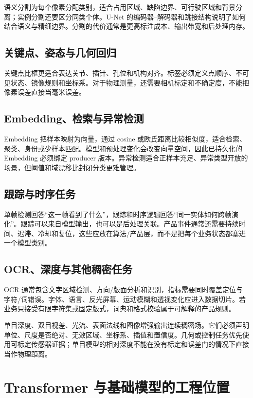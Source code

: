 语义分割为每个像素分配类别，适合占用区域、缺陷边界、可行驶区域和背景分离；实例分割还要区分同类个体。U-Net 的编码器--解码器和跳接结构说明了如何结合语义与精细边界\cite{unet}。分割的代价通常是更高标注成本、输出带宽和后处理内存。

\subsection{关键点、姿态与几何回归}

关键点比框更适合表达关节、插针、孔位和机构对齐。标签必须定义点顺序、不可见状态、镜像规则和坐标系。对于物理测量，还需要相机标定和不确定度，不能把像素误差直接当毫米误差。

\subsection{Embedding、检索与异常检测}

Embedding 把样本映射为向量，通过 cosine 或欧氏距离比较相似度，适合检索、聚类、身份或少样本匹配。模型和预处理变化会改变向量空间，因此已持久化的 Embedding 必须绑定 producer 版本。异常检测适合正样本充足、异常类型开放的场景，但阈值和域漂移比封闭分类更难管理。

\subsection{跟踪与时序任务}

单帧检测回答“这一帧看到了什么”，跟踪和时序逻辑回答“同一实体如何跨帧演化”。跟踪可以来自模型输出，也可以是后处理关联。产品事件通常还需要持续时间、迟滞、冷却和复位，这些应放在算法/产品层，而不是把每个业务状态都塞进一个模型类别。

\subsection{OCR、深度与其他稠密任务}

OCR 通常包含文字区域检测、方向/版面分析和识别，指标需要同时覆盖定位与字符/词错误。字体、语言、反光屏幕、运动模糊和透视变化应进入数据切片。若业务只接受有限字符集或固定版式，词典和格式校验属于可解释的产品规则。

单目深度、双目视差、光流、表面法线和图像增强输出连续稠密场。它们必须声明单位、尺度是否绝对、无效区域、坐标系、插值和置信度。几何或控制任务优先使用可标定传感器证据；单目模型的相对深度不能在没有标定和误差门的情况下直接当作物理距离。

\section{Transformer 与基础模型的工程位置}

